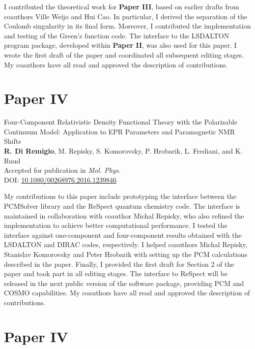 \documentclass[notitlepage,a4paper,11pt,dvipsnames]{article}
\newcommand*{\paper}[1]{\textbf{Paper #1}}
\begin{document}
I contributed the theoretical work for \paper{III}, based on earlier drafts from coauthors
Ville Weijo and Hui Cao. In particular, I derived the separation of
the Coulomb singularity in its final form.
Moreover, I contributed the implementation and testing of the Green's function code.
The interface to the LSDALTON program package, developed within
\paper{II}, was
also used for this paper.
I wrote the first draft of the paper and coordinated all subsequent editing stages.
My coauthors have all read and approved the description of contributions.

\section*{\paper{IV}}

\begin{tcolorbox}
  {\small
  \textsf{Four-Component Relativistic Density Functional Theory with the
  Polarizable Continuum Model: Application to EPR Parameters
  and Paramagnetic NMR Shifts
  }
  \\
  \textbf{R. Di Remigio}, M. Repisky, S. Komorovsky, P. Hrobarik, L.
  Frediani, and K. Ruud
  \\
  Accepted for publication in \textit{Mol. Phys.}
  \\
  DOI: \url{10.1080/00268976.2016.1239846}
  }
\end{tcolorbox}

My contributions to this paper include prototyping the interface between the
PCMSolver library and the ReSpect quantum chemistry code.
The interface is maintained in collaboration with coauthor Michal Repisky, who also
refined the implementation to achieve better computational performance.
I tested the interface against one-component and four-component results obtained with
the LSDALTON and DIRAC codes, respectively.
I helped coauthors Michal Repisky, Stanislav Komorovsky and Peter Hrobarik
with setting up the PCM calculations described in the paper.
Finally, I provided the first draft for Section 2 of the paper and took part in all editing stages.
The interface to ReSpect will be released in the next public version of the software
package, providing PCM and COSMO capabilities.
My coauthors have all read and approved the description of contributions.

\section*{\paper{IV}}
\end{document}

